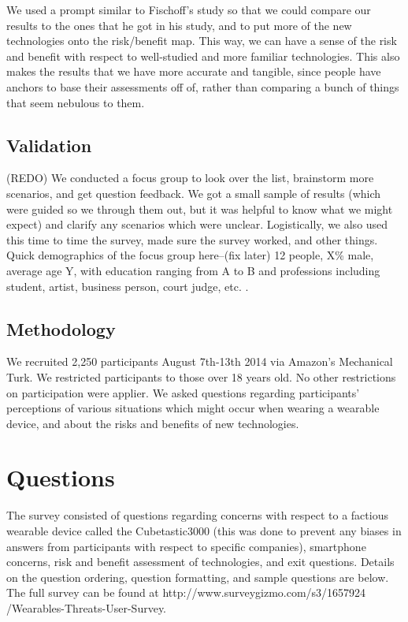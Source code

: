 \documentclass{acm_proc_article-sp}
\begin{document}
We used a prompt similar to Fischoff's study so that we could compare our results to the ones that he got in his study, and to put more of the new technologies onto the risk/benefit map. This way, we can have a sense of the risk and benefit with respect to well-studied and more familiar technologies. This also makes the results that we have more accurate and tangible, since people have anchors to base their assessments off of, rather than comparing a bunch of things that seem nebulous to them.

\subsection{Validation}
(REDO) We conducted a focus group to look over the list, brainstorm more scenarios,  and get question feedback. We got a small sample of results (which were guided so we through them out, but it was helpful to know what we might expect) and clarify any scenarios which were unclear. Logistically, we also used this time to time the survey, made sure the survey worked, and other things. Quick demographics of the focus group here--(fix later) 12 people, X\% male, average age Y, with education ranging from A to B and professions including student, artist, business person, court judge, etc.  .

\subsection{Methodology}
We recruited 2,250 participants August 7th-13th 2014 via Amazon's Mechanical Turk. We restricted participants to those over 18 years old. No other restrictions on participation were applier. We asked questions regarding participants' perceptions of various situations which might occur when wearing a wearable device, and about the risks and benefits of new technologies.
 
 
\section{Questions}
The survey consisted of questions regarding concerns with respect to a factious wearable device called the Cubetastic3000 (this was done to prevent any biases in answers from participants with respect to specific companies), smartphone concerns, risk and benefit assessment of technologies, and exit questions. Details on the question ordering, question formatting, and sample questions are below. The full survey can be found at http://www.surveygizmo.com/s3/1657924 /Wearables-Threats-User-Survey. 
\end{document}
